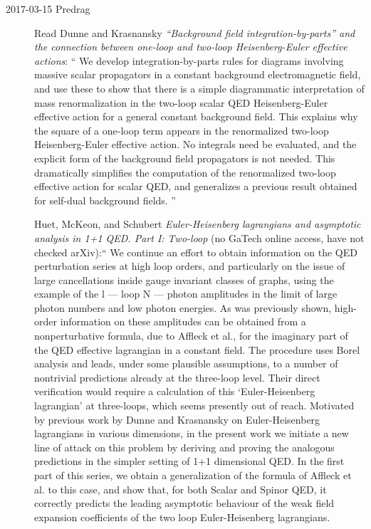 \begin{description}
\item[2017-03-15 Predrag] Read
Dunne and Krasnansky {\em ``Background field
integration-by-parts'' and the connection between one-loop and two-loop
{Heisenberg-Euler} effective actions}: ``
We develop integration-by-parts rules for diagrams involving massive
scalar propagators in a constant background electromagnetic field, and
use these to show that there is a simple diagrammatic interpretation of
mass renormalization in the two-loop scalar QED Heisenberg-Euler
effective action for a general constant background field. This explains
why the square of a one-loop term appears in the renormalized two-loop
Heisenberg-Euler effective action. No integrals need be evaluated, and
the explicit form of the background field propagators is not needed. This
dramatically simplifies the computation of the renormalized two-loop
effective action for scalar QED, and generalizes a previous result
obtained for self-dual background fields.
''

Huet, McKeon, and Schubert
{\em {Euler-Heisenberg} lagrangians and asymptotic analysis in 1+1 {QED. Part I: Two}-loop}
(no GaTech online access, have not checked arXiv):``
We continue an effort to obtain information on the QED perturbation
series at high loop orders, and particularly on the issue of large
cancellations inside gauge invariant classes of graphs, using the example
of the l --- loop N --- photon amplitudes in the limit of large photon
numbers and low photon energies. As was previously shown, high-order
information on these amplitudes can be obtained from a nonperturbative
formula, due to Affleck et al., for the imaginary part of the QED
effective lagrangian in a constant field. The procedure uses Borel
analysis and leads, under some plausible assumptions, to a number of
nontrivial predictions already at the three-loop level. Their direct
verification would require a calculation of this `Euler-Heisenberg
lagrangian' at three-loops, which seems presently out of reach. Motivated
by previous work by Dunne and Krasnansky on Euler-Heisenberg
lagrangians in various dimensions, in the present work we initiate a new
line of attack on this problem by deriving and proving the analogous
predictions in the simpler setting of 1+1 dimensional QED. In the first
part of this series, we obtain a generalization of the formula of Affleck
et al. to this case, and show that, for both Scalar and Spinor QED, it
correctly predicts the leading asymptotic behaviour of the weak field
expansion coefficients of the two loop Euler-Heisenberg lagrangians.


\end{description}
